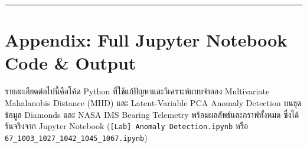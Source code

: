 \documentclass[12pt,a4paper]{article}
\begin{document}
\vspace{0.8em}
\hrule
\vspace{0.8em}

\clearpage
\appendix
\raggedbottom
\section*{Appendix: Full Jupyter Notebook Code \& Output}

รายละเอียดต่อไปนี้คือโค้ด Python ที่ใช้แก้ปัญหาและวิเคราะห์แบบจำลอง Multivariate Mahalanobis Distance (MHD) และ Latent-Variable PCA Anomaly Detection บนชุดข้อมูล Diamonds และ NASA IMS Bearing Telemetry พร้อมผลลัพธ์และกราฟทั้งหมด ซึ่งได้รันจริงจาก Jupyter Notebook (\texttt{[Lab] Anomaly Detection.ipynb} หรือ \texttt{67\_1003\_1027\_1042\_1045\_1067.ipynb})


\end{document}
